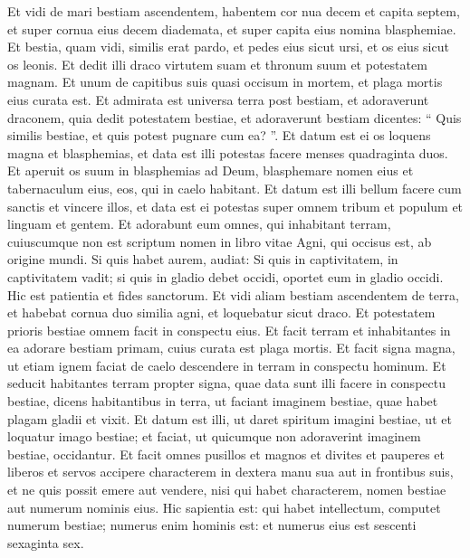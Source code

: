 \begin{biblechapter}
\begin{biblechapter}
\begin{biblechapter}
\begin{biblechapter}
\begin{biblechapter}
\begin{biblechapter}
\begin{biblechapter}
\begin{biblechapter}
\begin{biblechapter}
\begin{biblechapter}
\begin{biblechapter}
\begin{biblechapter}
\begin{biblechapter}
\verse Et vidi de mari bestiam ascendentem, habentem cor nua decem et capita septem, et super cornua eius decem diademata, et super capita eius nomina blasphemiae. 
\verse Et bestia, quam vidi, similis erat pardo, et pedes eius sicut ursi, et os eius sicut os leonis. Et dedit illi draco virtutem suam et thronum suum et potestatem magnam. 
\verse Et unum de capitibus suis quasi occisum in mortem, et plaga mortis eius curata est.
 Et admirata est universa terra post bestiam, 
\verse et adoraverunt draconem, quia dedit potestatem bestiae, et adoraverunt bestiam dicentes: “ Quis similis bestiae, et quis potest pugnare cum ea? ”.
 \verse Et datum est ei os loquens magna et blasphemias, et data est illi potestas facere menses quadraginta duos. 
\verse Et aperuit os suum in blasphemias ad Deum, blasphemare nomen eius et tabernaculum eius, eos, qui in caelo habitant. 
\verse Et datum est illi bellum facere cum sanctis et vincere illos, et data est ei potestas super omnem tribum et populum et linguam et gentem. 
\verse Et adorabunt eum omnes, qui inhabitant terram, cuiuscumque non est scriptum nomen in libro vitae Agni, qui occisus est, ab origine mundi. 
\verse Si quis habet aurem, audiat:
 \verse Si quis in captivitatem,
 in captivitatem vadit;
 si quis in gladio debet occidi,
 oportet eum in gladio occidi.
 Hic est patientia et fides sanctorum.
 \verse Et vidi aliam bestiam ascendentem de terra, et habebat cornua duo similia agni, et loquebatur sicut draco. 
\verse Et potestatem prioris bestiae omnem facit in conspectu eius. Et facit terram et inhabitantes in ea adorare bestiam primam, cuius curata est plaga mortis. 
\verse Et facit signa magna, ut etiam ignem faciat de caelo descendere in terram in conspectu hominum. 
\verse Et seducit habitantes terram propter signa, quae data sunt illi facere in conspectu bestiae, dicens habitantibus in terra, ut faciant imaginem bestiae, quae habet plagam gladii et vixit. 
\verse Et datum est illi, ut daret spiritum imagini bestiae, ut et loquatur imago bestiae; et faciat, ut quicumque non adoraverint imaginem bestiae, occidantur. 
\verse Et facit omnes pusillos et magnos et divites et pauperes et liberos et servos accipere characterem in dextera manu sua aut in frontibus suis, 
\verse et ne quis possit emere aut vendere, nisi qui habet characterem, nomen bestiae aut numerum nominis eius. 
\verse Hic sapientia est: qui habet intellectum, computet numerum bestiae; numerus enim hominis est: et numerus eius est sescenti sexaginta sex.
 

\end{biblechapter}
\end{biblechapter}
\end{biblechapter}
\end{biblechapter}
\end{biblechapter}
\end{biblechapter}
\end{biblechapter}
\end{biblechapter}
\end{biblechapter}
\end{biblechapter}
\end{biblechapter}
\end{biblechapter}
\end{biblechapter}

